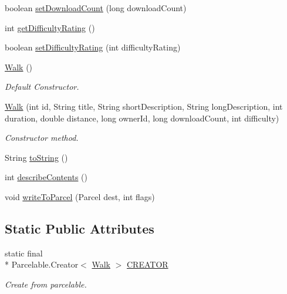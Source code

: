 \begin{DoxyCompactItemize}
\item 
boolean \hyperlink{classuk_1_1ac_1_1swan_1_1digitaltrails_1_1components_1_1_walk_ab2ce244627930db6c602d9e93d541131}{set\+Download\+Count} (long download\+Count)
\item 
int \hyperlink{classuk_1_1ac_1_1swan_1_1digitaltrails_1_1components_1_1_walk_abaf7135cd2be3fb2724d5b10a11334d8}{get\+Difficulty\+Rating} ()
\item 
boolean \hyperlink{classuk_1_1ac_1_1swan_1_1digitaltrails_1_1components_1_1_walk_a0de0f63c1788da4c64db214782da18dc}{set\+Difficulty\+Rating} (int difficulty\+Rating)
\item 
\hyperlink{classuk_1_1ac_1_1swan_1_1digitaltrails_1_1components_1_1_walk_ae7daf6a8692296bf65be0a3eb065a4c9}{Walk} ()
\begin{DoxyCompactList}\small\item\em Default Constructor. \end{DoxyCompactList}\item 
\hyperlink{classuk_1_1ac_1_1swan_1_1digitaltrails_1_1components_1_1_walk_a87c01f8fd4faf953bf8f822fae4559cd}{Walk} (int id, String title, String short\+Description, String long\+Description, int duration, double distance, long owner\+Id, long download\+Count, int difficulty)
\begin{DoxyCompactList}\small\item\em Constructor method. \end{DoxyCompactList}\item 
String \hyperlink{classuk_1_1ac_1_1swan_1_1digitaltrails_1_1components_1_1_walk_a1c0e9d2fd3a2334532bfd6d68b620990}{to\+String} ()
\item 
int \hyperlink{classuk_1_1ac_1_1swan_1_1digitaltrails_1_1components_1_1_walk_a23a833257c737cda8cf0feb2c1c791e7}{describe\+Contents} ()
\item 
void \hyperlink{classuk_1_1ac_1_1swan_1_1digitaltrails_1_1components_1_1_walk_ae4413ee874cba88f42ca1bc5d423bed3}{write\+To\+Parcel} (Parcel dest, int flags)
\end{DoxyCompactItemize}
\subsection*{Static Public Attributes}
\begin{DoxyCompactItemize}
\item 
static final \\*
Parcelable.\+Creator$<$ \hyperlink{classuk_1_1ac_1_1swan_1_1digitaltrails_1_1components_1_1_walk}{Walk} $>$ \hyperlink{classuk_1_1ac_1_1swan_1_1digitaltrails_1_1components_1_1_walk_ab469affd3e3855b4319e907c95387385}{C\+R\+E\+A\+T\+O\+R}
\begin{DoxyCompactList}\small\item\em Create from parcelable. \end{DoxyCompactList}\end{DoxyCompactItemize}
